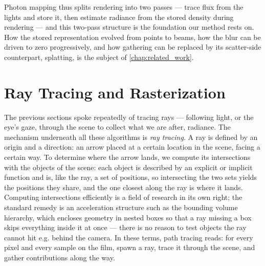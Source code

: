 Photon mapping thus splits rendering into two passes --- trace flux from the lights and store it, then estimate radiance from the stored density during rendering --- and this two-pass structure is the foundation our method rests on. How the stored representation evolved from points to beams, how the blur can be driven to zero progressively, and how gathering can be replaced by its scatter-side counterpart, splatting, is the subject of \cref{chap:related_work}.

\section{Ray Tracing and Rasterization}
\label{sec:bg_raster_vs_rt}

The previous sections spoke repeatedly of tracing rays --- following light, or the eye's gaze, through the scene to collect what we are after, radiance. The mechanism underneath all these algorithms is \emph{ray tracing}. A ray is defined by an origin and a direction: an arrow placed at a certain location in the scene, facing a certain way. To determine where the arrow lands, we compute its intersections with the objects of the scene: each object is described by an explicit or implicit function and is, like the ray, a set of positions, so intersecting the two sets yields the positions they share, and the one closest along the ray is where it lands. Computing intersections efficiently is a field of research in its own right; the standard remedy is an acceleration structure such as the bounding volume hierarchy, which encloses geometry in nested boxes so that a ray missing a box skips everything inside it at once \cite{meister21bvh} --- there is no reason to test objects the ray cannot hit e.g. behind the camera. In these terms, path tracing reads: for every pixel and every sample on the film, spawn a ray, trace it through the scene, and gather contributions along the way.

